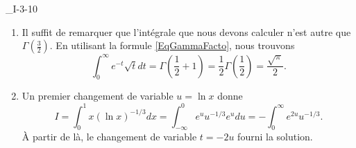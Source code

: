 \begin{corrige}{_I-3-10}
\begin{enumerate}
\item
Il suffit de remarquer que l'intégrale que nous devons calculer n'est autre que $\Gamma(\frac{ 3 }{ 2 })$. En utilisant la formule \eqref{EqGammaFacto}, nous trouvons
\begin{equation}
	\int_0^{\infty} e^{-t}\sqrt{t}dt=\Gamma( \frac{ 1 }{ 2 }+1 )=\frac{ 1 }{2}\Gamma(\frac{ 1 }{ 2 })=\frac{ \sqrt{\pi} }{2}.
\end{equation}

\item
Un premier changement de variable $u=\ln x$ donne
\begin{equation}
	I=\int_0^1x(\ln x)^{-1/3}dx=\int_{-\infty}^0 e^{u}u^{-1/3} e^{u}du=-\int_0^{\infty} e^{2u}u^{-1/3}.
\end{equation}
À partir de là, le changement de variable $t=-2u$ fourni la solution.

\end{enumerate}


\end{corrige}

